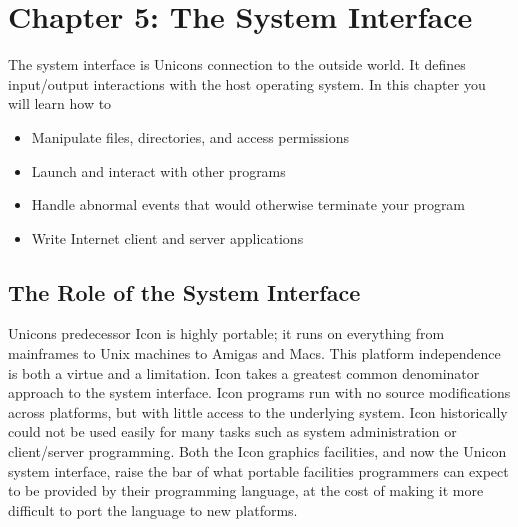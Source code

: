 \clearpage\section{Chapter 5: The System Interface}

The system interface is
Unicon{\textquotesingle}s connection to the outside world. It defines
input/output interactions with the host
operating system. In this chapter you will learn how to

\begin{itemize}
\item Manipulate files, directories, and
access permissions
\item Launch and interact with other programs
\item Handle abnormal events that would otherwise terminate your program
\item Write Internet client and
server applications
\end{itemize}

\subsection{The Role of the System Interface}

Unicon{\textquotesingle}s predecessor Icon is highly portable; it runs
on everything from mainframes to Unix machines to Amigas and Macs. This
platform independence is both a virtue and a limitation. Icon takes a
greatest common denominator approach to the system interface. Icon
programs run with no source modifications across platforms, but with
little access to the underlying system. Icon historically could not be
used easily for many tasks such as system administration or
client/server programming. Both the Icon graphics facilities, and now
the Unicon system interface, {\textquotedbl}raise the
bar{\textquotedbl} of what portable facilities programmers can expect
to be provided by their programming language, at the cost of making it
more difficult to port the language to new platforms.

